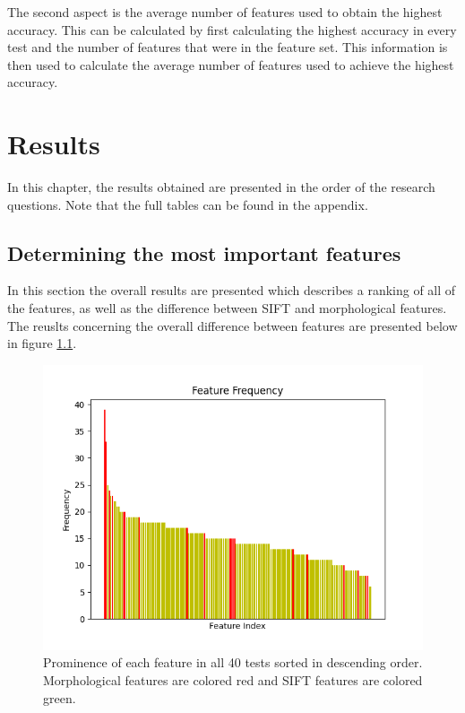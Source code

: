 \documentclass{kththesis}
\begin{document}
The second aspect is the average number of features used to obtain the highest accuracy. This can be calculated by first calculating the highest accuracy in every test and the number of features that were in the feature set. This information is then used to calculate the average number of features used to achieve the highest accuracy. 


\chapter{Results}

In this chapter, the results obtained are presented in the order of the research questions. Note that the full tables can be found in the appendix.


\section{Determining the most important features}

In this section the overall results are presented which describes a ranking of all of the features, as well as the difference between SIFT and morphological features. The reuslts concerning the overall difference between features are presented below in figure \ref{fig:all_freq}.




\begin{figure}[h!]
  \centering
  \includegraphics[scale=0.8]{./figures/Figure_all_fres.png}
  \caption{Prominence of each feature in all 40 tests sorted in descending order. Morphological features are colored red and SIFT features are colored green.}
  \label{fig:all_freq}
\end{figure}
\end{document}
